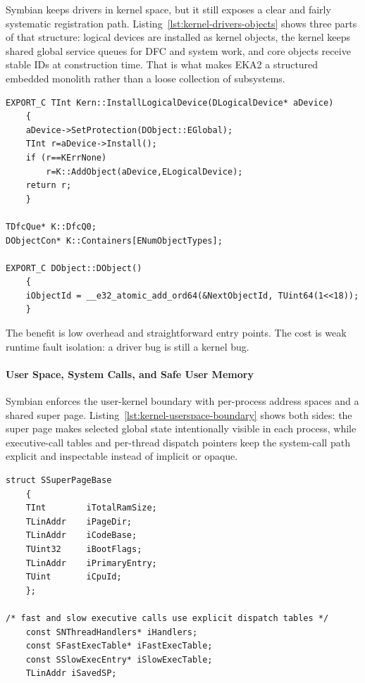 Symbian keeps drivers in kernel space, but it still exposes a clear and fairly
systematic registration path. Listing~\ref{lst:kernel-drivers-objects} shows
three parts of that structure: logical devices are installed as kernel
objects, the kernel keeps shared global service queues for DFC and system work,
and core objects receive stable IDs at construction time. That is what makes
EKA2 a structured embedded monolith rather than a loose collection of
subsystems.

\begin{listing}[H]
\begin{verbatim}
EXPORT_C TInt Kern::InstallLogicalDevice(DLogicalDevice* aDevice)
	{
	aDevice->SetProtection(DObject::EGlobal);
	TInt r=aDevice->Install();
	if (r==KErrNone)
		r=K::AddObject(aDevice,ELogicalDevice);
	return r;
	}

TDfcQue* K::DfcQ0;
DObjectCon* K::Containers[ENumObjectTypes];

EXPORT_C DObject::DObject()
	{
	iObjectId = __e32_atomic_add_ord64(&NextObjectId, TUint64(1<<18));
	}
\end{verbatim}
\caption{Kernel driver installation, shared global state, and base object
construction. Files: \texttt{device.cpp}, \texttt{sglobals.cpp}, and
\texttt{object.cpp}.}
\label{lst:kernel-drivers-objects}
\end{listing}

The benefit is low overhead and straightforward entry points. The cost is weak
runtime fault isolation: a driver bug is still a kernel bug.

\paragraph{User Space, System Calls, and Safe User Memory}

Symbian enforces the user-kernel boundary with per-process address spaces and a
shared super page. Listing~\ref{lst:kernel-userspace-boundary} shows both
sides: the super page makes selected global state intentionally visible in each
process, while executive-call tables and per-thread dispatch pointers keep the
system-call path explicit and inspectable instead of implicit or opaque.

\begin{listing}[H]
\begin{verbatim}
struct SSuperPageBase
	{
	TInt		iTotalRamSize;
	TLinAddr	iPageDir;
	TLinAddr	iCodeBase;
	TUint32		iBootFlags;
	TLinAddr	iPrimaryEntry;
	TUint		iCpuId;
	};

/* fast and slow executive calls use explicit dispatch tables */
	const SNThreadHandlers* iHandlers;
	const SFastExecTable* iFastExecTable;
	const SSlowExecEntry* iSlowExecTable;
	TLinAddr iSavedSP;
\end{verbatim}
\caption{Shared super-page state and explicit executive-call dispatch
machinery. Files: \texttt{kernboot.h}, \texttt{execs.h}, and
\texttt{nk\_priv.h}.}
\label{lst:kernel-userspace-boundary}
\end{listing}

